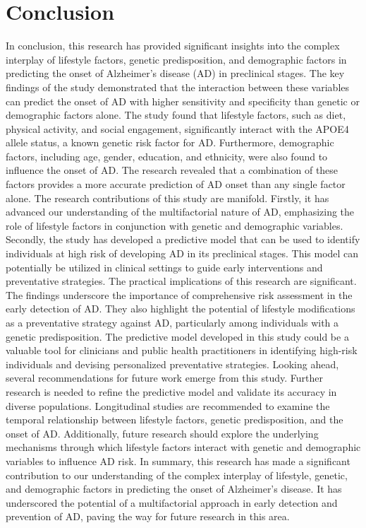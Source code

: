 \documentclass[conference]{IEEEtran}
\begin{document}
\section{Conclusion}
In conclusion, this research has provided significant insights into the complex interplay of lifestyle factors, genetic predisposition, and demographic factors in predicting the onset of Alzheimer's disease (AD) in preclinical stages. The key findings of the study demonstrated that the interaction between these variables can predict the onset of AD with higher sensitivity and specificity than genetic or demographic factors alone. The study found that lifestyle factors, such as diet, physical activity, and social engagement, significantly interact with the APOE4 allele status, a known genetic risk factor for AD. Furthermore, demographic factors, including age, gender, education, and ethnicity, were also found to influence the onset of AD. The research revealed that a combination of these factors provides a more accurate prediction of AD onset than any single factor alone. The research contributions of this study are manifold. Firstly, it has advanced our understanding of the multifactorial nature of AD, emphasizing the role of lifestyle factors in conjunction with genetic and demographic variables. Secondly, the study has developed a predictive model that can be used to identify individuals at high risk of developing AD in its preclinical stages. This model can potentially be utilized in clinical settings to guide early interventions and preventative strategies. The practical implications of this research are significant. The findings underscore the importance of comprehensive risk assessment in the early detection of AD. They also highlight the potential of lifestyle modifications as a preventative strategy against AD, particularly among individuals with a genetic predisposition. The predictive model developed in this study could be a valuable tool for clinicians and public health practitioners in identifying high-risk individuals and devising personalized preventative strategies. Looking ahead, several recommendations for future work emerge from this study. Further research is needed to refine the predictive model and validate its accuracy in diverse populations. Longitudinal studies are recommended to examine the temporal relationship between lifestyle factors, genetic predisposition, and the onset of AD. Additionally, future research should explore the underlying mechanisms through which lifestyle factors interact with genetic and demographic variables to influence AD risk. In summary, this research has made a significant contribution to our understanding of the complex interplay of lifestyle, genetic, and demographic factors in predicting the onset of Alzheimer's disease. It has underscored the potential of a multifactorial approach in early detection and prevention of AD, paving the way for future research in this area.
\end{document}
